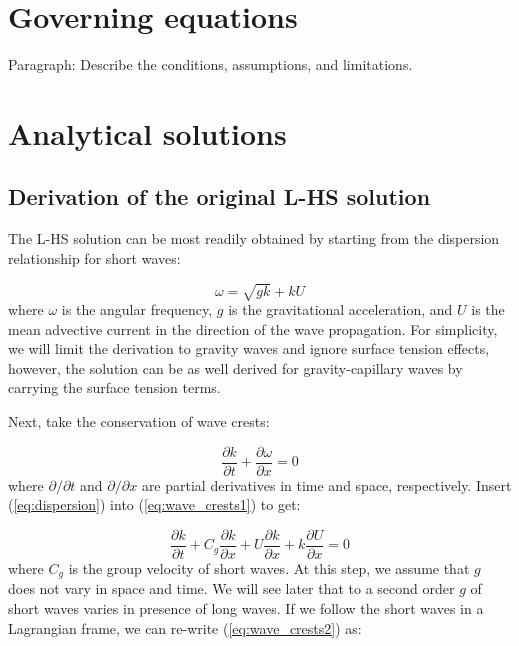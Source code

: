 \documentclass[draft]{agujournal2019}
\begin{document}
\section{Governing equations}

Paragraph: Describe the conditions, assumptions, and limitations.

\section{Analytical solutions}

\subsection{Derivation of the original L-HS solution}

The L-HS solution can be most readily obtained by starting from the dispersion
relationship for short waves:

\begin{equation}
\label{eq:dispersion}
\omega = \sqrt{gk} + k U
\end{equation}
where $\omega$ is the angular frequency,
$g$ is the gravitational acceleration,
and $U$ is the mean advective current in the direction of the wave propagation.
For simplicity, we will limit the derivation to gravity waves and ignore
surface tension effects, however, the solution can be as well derived for
gravity-capillary waves by carrying the surface tension terms.

Next, take the conservation of wave crests:

\begin{equation}
\label{eq:wave_crests1}
\dfrac{\partial k}{\partial t}
+ \dfrac{\partial \omega}{\partial x}
= 0
\end{equation}
where $\partial/\partial t$ and $\partial/\partial x$ are partial derivatives
in time and space, respectively.
Insert (\ref{eq:dispersion}) into (\ref{eq:wave_crests1}) to get:

\begin{equation}
\label{eq:wave_crests2}
\dfrac{\partial k}{\partial t}
+ C_g \dfrac{\partial k}{\partial x}
+ U \dfrac{\partial k}{\partial x}
+ k \dfrac{\partial U}{\partial x}
= 0
\end{equation}
where $C_g$ is the group velocity of short waves.
At this step, we assume that $g$ does not vary in space and time.
We will see later that to a second order $g$ of short waves varies in presence
of long waves.
If we follow the short waves in a Lagrangian frame, we can re-write
(\ref{eq:wave_crests2}) as:
\end{document}
